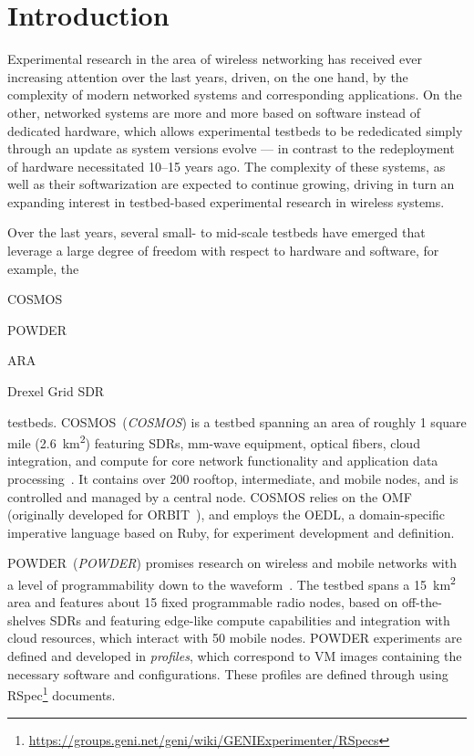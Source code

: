 \section{Introduction}
Experimental research in the area of wireless networking has received ever increasing attention over the last years, driven, on the one hand, by the complexity of modern networked systems and corresponding applications. 
On the other, networked systems are more and more based on software instead of dedicated hardware, which allows experimental testbeds to be rededicated simply through an update as system versions evolve --- in contrast to the redeployment of hardware necessitated \numrange[range-phrase={--}]{10}{15} years ago.
The complexity of these systems, as well as their softwarization are expected to continue growing, driving in turn an expanding interest in testbed-based experimental research in wireless systems.

Over the last years, several small- to mid-scale testbeds have emerged that leverage a large degree of freedom with respect to hardware and software, for example, the 
\begin{enumerate*}[itemjoin={{, }}, itemjoin*={{, and }}]
    \item \acs*{COSMOS}
    \item \acs*{POWDER}
    \item \acs*{ARA}
    \item Drexel Grid \gls{SDR}
\end{enumerate*} testbeds.
\acs{COSMOS}~(\emph{\acl{COSMOS}}) is a testbed spanning an area of roughly \num{1} square mile (\SI{2.6}{\kilo\meter\squared}) featuring \acp{SDR}, \si{\milli\meter}-wave equipment, optical fibers, cloud integration, and compute for core network functionality and application data processing~\cite{Cosmos1,cosmos2}.
It contains over \num{200} rooftop, intermediate, and mobile nodes, and is controlled and managed by a central node.
\gls{COSMOS} relies on the \gls{OMF} (originally developed for ORBIT~\cite{orbit}), and employs the \gls{OEDL}, a domain-specific imperative language based on Ruby, for experiment development and definition.

\acs{POWDER}~(\emph{\acl{POWDER}}) promises research on wireless and mobile networks with a level of programmability down to the waveform~\cite{powder}.
The testbed spans a \SI{15}{\kilo\meter\squared} area and features about \num{15} fixed programmable radio nodes, based on off-the-shelves \acp{SDR} and featuring edge-like compute capabilities and integration with cloud resources, which interact with \num{50} mobile nodes. 
\gls{POWDER} experiments are defined and developed in \emph{profiles}, which correspond to \gls{VM} images containing the necessary software and configurations.
These profiles are defined through using \gls{RSpec}\footnote{\url{https://groups.geni.net/geni/wiki/GENIExperimenter/RSpecs}} documents.

